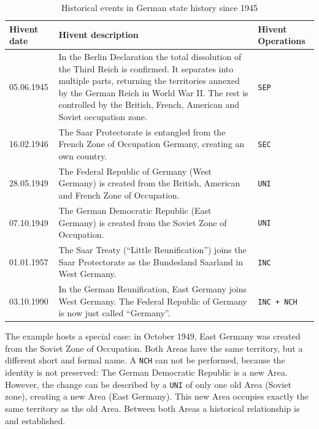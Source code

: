 \begin{table}[ht]
\begin{center}
\begin{tabular}{l p{8.8cm} l}
  \toprule
  Hivent date & Hivent description & Hivent Operations \\
  \midrule

    05.06.1945
  & \normalsize{In the Berlin Declaration the total dissolution of the Third Reich is confirmed. It separates into multiple parts, returning the territories annexed by the German Reich in World War II. The rest is controlled by the British, French, American and Soviet occupation zone.}
  & \texttt{SEP} \\[1.5em]

    16.02.1946
  & \normalsize{The Saar Protectorate is entangled from the French Zone of Occupation Germany, creating an own country.}
  & \texttt{SEC} \\[1.5em]

    28.05.1949
  & \normalsize{The Federal Republic of Germany (West Germany) is created from the British, American and French Zone of Occupation.}
  & \texttt{UNI} \\[1.5em]

    07.10.1949
  & \normalsize{The German Democratic Republic (East Germany) is created from the Soviet Zone of Occupation.}
  & \texttt{UNI} \\[1.5em]

    01.01.1957
  & \normalsize{The Saar Treaty (``Little Reunification'') joins the Saar Protectorate as the Bundesland Saarland in West Germany.}
  & \texttt{INC} \\[1.5em]

    03.10.1990
  & \normalsize{In the German Reunification, East Germany joins West Germany. The Federal Republic of Germany is now just called ``Germany''.}
  & \texttt{INC + NCH} \\[1.5em]

  \bottomrule
\end{tabular}
\caption{Historical events in German state history since 1945}
\label{tab:german_history_since_1945}
\end{center}
\end{table}

The example hosts a special case: in October 1949, East Germany was created from the Soviet Zone of Occupation. Both Areas have the same territory, but a different short and formal name. A \texttt{NCH} can not be performed, because the identity is not preserved: The German Democratic Republic is a new Area. However, the change can be described by a \texttt{UNI} of only one old Area (Soviet zone), creating a new Area (East Germany). This new Area occupies exactly the same territory as the old Area. Between both Areas a historical relationship is and established.

